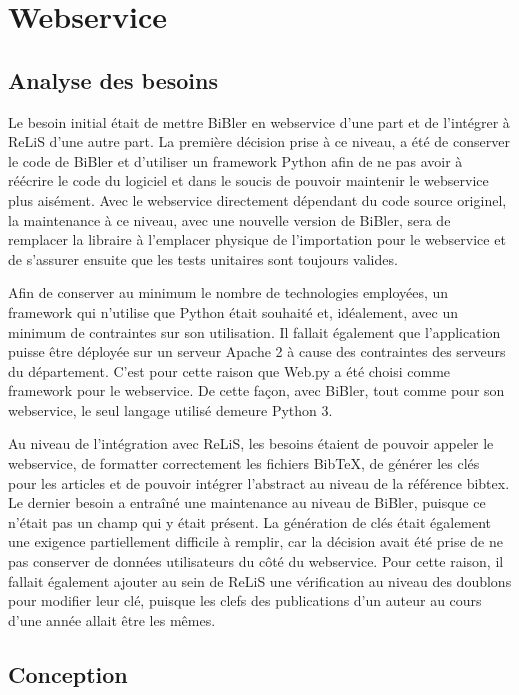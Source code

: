 \documentclass[a4paper,12pt,titlepage]{article}
\let\oldsection\section
\renewcommand\section{\clearpage\oldsection}
\begin{document}
\section{Webservice}
\subsection{Analyse des besoins}
Le besoin initial était de mettre BiBler en webservice d'une part et de l'intégrer à ReLiS d'une autre part. La première décision prise à ce niveau, a été de conserver le code de BiBler et d'utiliser un framework Python afin de ne pas avoir à réécrire le code du logiciel et dans le soucis de pouvoir maintenir le webservice plus aisément. Avec le webservice directement dépendant du code source originel, la maintenance à ce niveau, avec une nouvelle version de BiBler, sera de remplacer la libraire à l'emplacer physique de l'importation pour le webservice et de s'assurer ensuite que les tests unitaires sont toujours valides. \newline

Afin de conserver au minimum le nombre de technologies employées, un framework qui n'utilise que Python était souhaité et, idéalement, avec un minimum de contraintes sur son utilisation. Il fallait également que l'application puisse être déployée sur un serveur Apache 2 à cause des contraintes des serveurs du département. C'est pour cette raison que Web.py \cite{Webpy1} a été choisi comme framework pour le webservice. De cette façon, avec BiBler, tout comme pour son webservice, le seul langage utilisé demeure Python 3. \newline

Au niveau de l'intégration avec ReLiS, les besoins étaient de pouvoir appeler le webservice, de formatter correctement les fichiers BibTeX, de générer les clés pour les articles et de pouvoir intégrer l'abstract au niveau de la référence bibtex. Le dernier besoin a entraîné une maintenance au niveau de BiBler, puisque ce n'était pas un champ qui y était présent. La génération de clés était également une exigence partiellement difficile à remplir, car la décision avait été prise de ne pas conserver de données utilisateurs du côté du webservice. Pour cette raison, il fallait également ajouter au sein de ReLiS une vérification au niveau des doublons pour modifier leur clé, puisque les clefs des publications d'un auteur au cours d'une année allait être les mêmes. \newline


\subsection{Conception}
\end{document}
